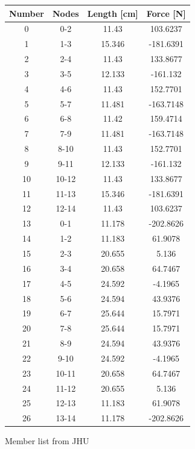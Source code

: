 \documentclass{report}
\begin{document}
\begin{figure}[H]
	\centering
	\begin{tabular}{|c|c|c|c|}
		\hline
		Number & Nodes & Length [cm] & Force [N] \\
		\hline
		0      & 0-2   & 11.43       & 103.6237  \\
		1      & 1-3   & 15.346      & -181.6391 \\
		2      & 2-4   & 11.43       & 133.8677  \\
		3      & 3-5   & 12.133      & -161.132  \\
		4      & 4-6   & 11.43       & 152.7701  \\
		5      & 5-7   & 11.481      & -163.7148 \\
		6      & 6-8   & 11.42       & 159.4714  \\
		7      & 7-9   & 11.481      & -163.7148 \\
		8      & 8-10  & 11.43       & 152.7701  \\
		9      & 9-11  & 12.133      & -161.132  \\
		10     & 10-12 & 11.43       & 133.8677  \\
		11     & 11-13 & 15.346      & -181.6391 \\
		12     & 12-14 & 11.43       & 103.6237  \\
		13     & 0-1   & 11.178      & -202.8626 \\
		14     & 1-2   & 11.183      & 61.9078   \\
		15     & 2-3   & 20.655      & 5.136     \\
		16     & 3-4   & 20.658      & 64.7467   \\
		17     & 4-5   & 24.592      & -4.1965   \\
		18     & 5-6   & 24.594      & 43.9376   \\
		19     & 6-7   & 25.644      & 15.7971   \\
		20     & 7-8   & 25.644      & 15.7971   \\
		21     & 8-9   & 24.594      & 43.9376   \\
		22     & 9-10  & 24.592      & -4.1965   \\
		23     & 10-11 & 20.658      & 64.7467   \\
		24     & 11-12 & 20.655      & 5.136     \\
		25     & 12-13 & 11.183      & 61.9078   \\
		26     & 13-14 & 11.178      & -202.8626 \\
		\hline
	\end{tabular}
	\caption{Member list from JHU}
	\label{fig:jhu-ml}
\end{figure}
\end{document}
